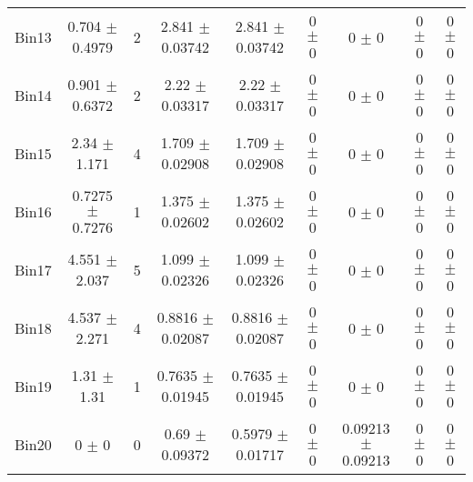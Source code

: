 \begin{tabular}{@{\extracolsep{4pt}}lcccccccc@{}}
     Bin13 & 0.704 $\pm$ 0.4979 & 2 & 2.841 $\pm$ 0.03742 & 2.841 $\pm$ 0.03742 & 0 $\pm$ 0 & 0 $\pm$ 0 & 0 $\pm$ 0 & 0 $\pm$ 0 \\ 
     Bin14 & 0.901 $\pm$ 0.6372 & 2 & 2.22 $\pm$ 0.03317 & 2.22 $\pm$ 0.03317 & 0 $\pm$ 0 & 0 $\pm$ 0 & 0 $\pm$ 0 & 0 $\pm$ 0 \\ 
     Bin15 & 2.34 $\pm$ 1.171 & 4 & 1.709 $\pm$ 0.02908 & 1.709 $\pm$ 0.02908 & 0 $\pm$ 0 & 0 $\pm$ 0 & 0 $\pm$ 0 & 0 $\pm$ 0 \\ 
     Bin16 & 0.7275 $\pm$ 0.7276 & 1 & 1.375 $\pm$ 0.02602 & 1.375 $\pm$ 0.02602 & 0 $\pm$ 0 & 0 $\pm$ 0 & 0 $\pm$ 0 & 0 $\pm$ 0 \\ 
     Bin17 & 4.551 $\pm$ 2.037 & 5 & 1.099 $\pm$ 0.02326 & 1.099 $\pm$ 0.02326 & 0 $\pm$ 0 & 0 $\pm$ 0 & 0 $\pm$ 0 & 0 $\pm$ 0 \\ 
     Bin18 & 4.537 $\pm$ 2.271 & 4 & 0.8816 $\pm$ 0.02087 & 0.8816 $\pm$ 0.02087 & 0 $\pm$ 0 & 0 $\pm$ 0 & 0 $\pm$ 0 & 0 $\pm$ 0 \\ 
     Bin19 & 1.31 $\pm$ 1.31 & 1 & 0.7635 $\pm$ 0.01945 & 0.7635 $\pm$ 0.01945 & 0 $\pm$ 0 & 0 $\pm$ 0 & 0 $\pm$ 0 & 0 $\pm$ 0 \\ 
     Bin20 & 0 $\pm$ 0 & 0 & 0.69 $\pm$ 0.09372 & 0.5979 $\pm$ 0.01717 & 0 $\pm$ 0 & 0.09213 $\pm$ 0.09213 & 0 $\pm$ 0 & 0 $\pm$ 0 \\ 
\hline\hline
  \end{tabular}
